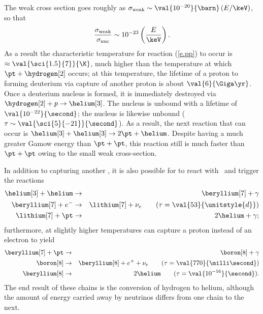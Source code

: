 The weak cross section goes roughly as $\sigma_{\mathrm{weak}} \sim \val{10^{-20}}{\barn}\left(E/\keV\right)$, so that
\[ \frac{\sigma_{\mathrm{weak}}}{\sigma_{\mathrm{nuc}}} \sim 10^{-23}\left(\frac{E}{\keV}\right). \]
As a result the characteristic temperature for reaction (\ref{e.pp}) to occur is $\approx \val{\sci{1.5}{7}}{\K}$, much higher than the temperature at which $\pt+\hydrogen[2]$ occurs; at this temperature, the lifetime of a proton to forming deuterium via capture of another proton is about $\val{6}{\Giga\yr}$.
Once a deuterium nucleus is formed, it is immediately destroyed via $\hydrogen[2]+p\to\helium[3]$. The nucleus \lithium[4] is unbound with a lifetime of $\val{10^{-22}}{\second}$; the nucleus \beryllium[6] is likewise unbound ($\tau \sim \val{\sci{5}{-21}}{\second}$). As a result, the next reaction that can occur is $\helium[3]+\helium[3]\to 2\pt+\helium$. Despite having a much greater Gamow energy than $\pt + \pt$, this reaction still is much faster than $\pt+\pt$ owing to the small weak cross-section.

In addition to capturing another \helium[3], it is also possible for \helium[3] to react with \helium\ and trigger the reactions
\begin{eqnarray}
\helium[3] + \helium &\to& \beryllium[7] + \gamma\nonumber\\
 \beryllium[7] + e^{-} &\to& \lithium[7] +  \nu_{e}\qquad(\tau=\val{53}{\unitstyle{d}})\nonumber \\
 \lithium[7] + \pt &\to& 2\helium + \gamma;
\label{e.pp-2}
\end{eqnarray}
furthermore, at slightly higher temperatures \beryllium[7] can capture a proton instead of an electron to yield
\begin{eqnarray}
\beryllium[7] + \pt &\to& \boron[8] + \gamma\nonumber\\
\boron[8] &\to& \beryllium[8] + e^{+} + \nu_{e}\qquad(\tau = \val{770}{\milli\second})\nonumber\\
\beryllium[8] &\to& 2\helium\qquad(\tau= \val{10^{-16}}{\second}).
\label{e.pp-3}
\end{eqnarray}
The end result of these chains is the conversion of hydrogen to helium, although the amount of energy carried away by neutrinos differs from one chain to the next.

